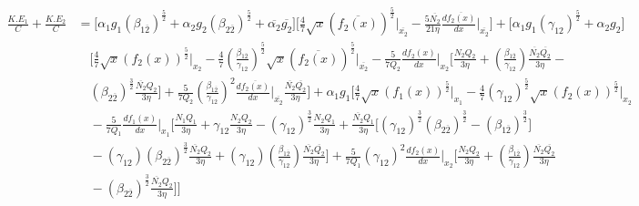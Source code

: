 \documentclass[fleqn, 10pt]{article}
\begin{document}
            \begin{equation*}
            \begin{split}
            \frac{K.E_1}{C} + \frac{K.E_2}{C} &= \bigl[ \alpha_1g_1 (\beta_{1\overline{2}})^\frac{5}{2} + \alpha_2 g_2 (\beta_{2\overline{2}})^\frac{5}{2} + \overline{\alpha_2}\overline{g_2} \bigr] \Biggl[\frac{4}{7}\sqrt{x}  (\overline{f_2(x)})^\frac{5}{2}\Bigg|_{\overline{x_2}}  -  \frac{5\overline{N_2}}{21\eta} \frac{d\overline{f_2(x)}}{dx}\Bigg|_{\overline{x_2}}\Biggr]  + \bigl[ \alpha_1 g_1 (\gamma_{12})^\frac{5}{2} + \alpha_2g_2 \bigr]\\ & \quad\Biggl[  \frac{4}{7} \sqrt{x} (f_2(x))^\frac{5}{2} \Bigg|_{x_2}  -   \frac{4}{7}\left(\frac{\beta_{1\overline{2}}}{\gamma_{12}}\right)^\frac{5}{2} \sqrt{x} (\overline{f_2(x)})^\frac{5}{2}\Bigg|_{\overline{x_2}} -   \frac{5}{7Q_2} \frac{df_2(x)}{dx}\Bigg|_{x_2} \Bigg[\frac{N_2Q_2}{3\eta}  + \left(\frac{\beta_{1\overline{2}}}{\gamma_{12}}\right)\frac{\overline{N_2}\overline{Q_2}}{3\eta} - \\ & \quad (\beta_{2\overline{2}})^\frac{3}{2}\frac{\overline{N_2} Q_2}{3\eta}\Biggr] +   \frac{5}{7Q_2} \left(\frac{\beta_{1\overline{2}}}{\gamma_{12}}\right)^2  
            \frac{d\overline{f_2(x)}}{dx} \Bigg|_{\overline{x_2}} \frac{\overline{N_2}\overline{Q_2}}{3\eta}\Biggr]+ \alpha_1 g_1 \Biggl[  \frac{4}{7} \sqrt{x} (f_1(x))^\frac{5}{2} \Bigg|_{x_1}  -   \frac{4}{7} (\gamma_{12})^\frac{5}{2}\sqrt{x}(f_2(x))^\frac{5}{2}\Bigg|_{x_2} \\ & \quad -   \frac{5}{7Q_1} \frac{df_1(x)}{dx}\Bigg|_{x_1}\Biggl[ \frac{N_1Q_1}{3\eta}  + \gamma_{12} \frac{N_2 Q_2}{3\eta}  - (\gamma_{12})^\frac{3}{2} \frac{N_2 Q_1}{3\eta}  + \frac{\overline{N_2}Q_1}{3\eta}\bigl[(\gamma_{12})^\frac{3}{2} (\beta_{2\overline{2}})^\frac{3}{2}  - (\beta_{1\overline{2}})^\frac{3}{2}\bigr]  \\ & \quad - (\gamma_{12}) (\beta_{2\overline{2}})^\frac{3}{2}\frac{\overline{N_2}Q_2}{3\eta} + (\gamma_{12})\left(\frac{\beta_{1\overline{2}}}{\gamma_{12}}\right)\frac{\overline{N_2}\overline{Q_2}}{3\eta}\Biggr]   +   \frac{5}{7Q_1} (\gamma_{12})^2 \frac{df_2(x)}{dx}\Bigg|_{x_2} \Biggl[ \frac{N_2Q_2}{3\eta} + \left(\frac{\beta_{1\overline{2}}}{\gamma_{12}}\right) \frac{\overline{N_2}\overline{Q_2}}{3\eta}  \\ & \quad - (\beta_{2\overline{2}})^\frac{3}{2} \frac{\overline{N_2}Q_2}{3\eta}\Biggr] \Biggr]
            \end{split}
            \end{equation*}
\end{document}

